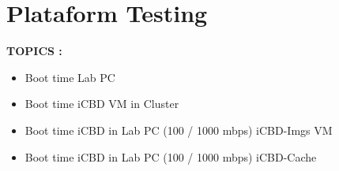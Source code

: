 


\section{Plataform Testing}
\label{sub:integration_testing}

\textbf{TOPICS :}
\begin{itemize}
	\item Boot time Lab PC
	\item Boot time iCBD VM in Cluster
	\item Boot time iCBD in Lab PC (100 / 1000 mbps) iCBD-Imgs VM
	\item Boot time iCBD in Lab PC (100 / 1000 mbps) iCBD-Cache
\end{itemize}